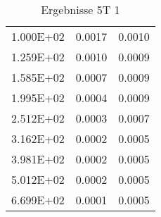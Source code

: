 \begin{table}
\begin{tabular}{l l l }
\num{1.000E+02}&\num{0.0017}&\num{0.0010}\\
\num{1.259E+02}&\num{0.0010}&\num{0.0009}\\
\num{1.585E+02}&\num{0.0007}&\num{0.0009}\\
\num{1.995E+02}&\num{0.0004}&\num{0.0009}\\
\num{2.512E+02}&\num{0.0003}&\num{0.0007}\\
\num{3.162E+02}&\num{0.0002}&\num{0.0005}\\
\num{3.981E+02}&\num{0.0002}&\num{0.0005}\\
\num{5.012E+02}&\num{0.0002}&\num{0.0005}\\
\num{6.699E+02}&\num{0.0001}&\num{0.0005}\\
\bottomrule
\end{tabular}\caption{Ergebnisse 5T 1}\end{table}
